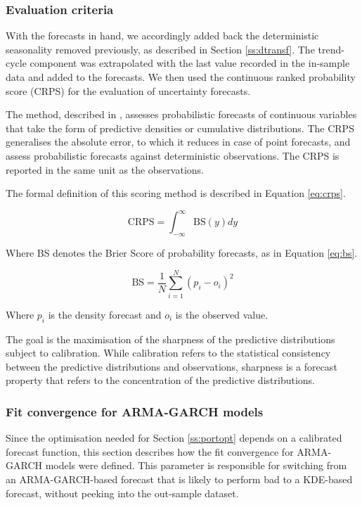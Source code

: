\documentclass[review, 3p, 12pt, authoryear]{elsarticle}
\begin{document}
\subsubsection{Evaluation criteria}
\label{sss:eval}
With the forecasts in hand, we accordingly added back the deterministic seasonality removed previously, as described in Section \ref{ss:dtransf}.
The trend-cycle component was extrapolated with the last value recorded in the in-sample data and added to the forecasts.
We then used the continuous ranked probability score (CRPS) for the evaluation of uncertainty forecasts.

The method, described in \citet{GBR2007crps}, assesses probabilistic forecasts of continuous variables that take the form of predictive densities or cumulative distributions.
The CRPS generalises the absolute error, to which it reduces in case of point forecasts, and assess probabilistic forecasts against deterministic observations.
The CRPS is reported in the same unit as the observations.

The formal definition of this scoring method is described in Equation \ref{eq:crps}.

\begin{equation}
   \text{CRPS} = \int_{-\infty}^{\infty} \text{BS}(y) dy
   \label{eq:crps}
\end{equation}

Where BS denotes the Brier Score \citep{brier1950verification} of probability forecasts, as in Equation \ref{eq:bs}.

\begin{equation}
   \text{BS} = \frac{1}{N} \sum_{i=1}^N {(p_i - o_i)}^2
   \label{eq:bs}
\end{equation}

Where $p_i$ is the density forecast and $o_i$ is the observed value.

The goal is the maximisation of the sharpness of the predictive distributions subject to calibration.
While calibration refers to the statistical consistency between the predictive distributions and observations, sharpness is a forecast property that refers to the concentration of the predictive distributions.

\subsubsection{Fit convergence for ARMA-GARCH models}
\label{sss:gof.min}
Since the optimisation needed for Section \ref{ss:portopt} depends on a calibrated forecast function, this section describes how the fit convergence for ARMA-GARCH models were defined.
This parameter is responsible for switching from an ARMA-GARCH-based forecast that is likely to perform bad to a KDE-based forecast, without peeking into the out-sample dataset.
\end{document}
